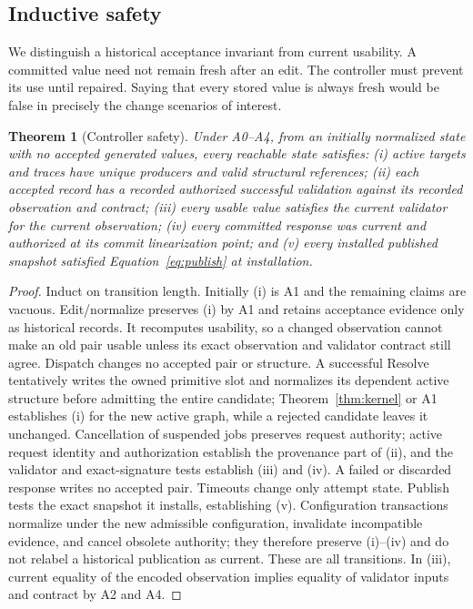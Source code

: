 \documentclass[pdflatex,sn-mathphys-num]{sn-jnl}
\theoremstyle{thmstyleone}
\newtheorem{theorem}{Theorem}
\theoremstyle{thmstylethree}
\theoremstyle{thmstyletwo}
\begin{document}
\subsection{Inductive safety}
We distinguish a historical acceptance invariant from current usability. A committed value need not remain fresh after an edit. The controller must prevent its use until repaired. Saying that every stored value is always fresh would be false in precisely the change scenarios of interest.

\begin{theorem}[Controller safety]\label{thm:safety}
Under A0--A4, from an initially normalized state with no accepted generated values, every reachable state satisfies: (i) active targets and traces have unique producers and valid structural references; (ii) each accepted record has a recorded authorized successful validation against its recorded observation and contract; (iii) every usable value satisfies the current validator for the current observation; (iv) every committed response was current and authorized at its commit linearization point; and (v) every installed published snapshot satisfied Equation~\eqref{eq:publish} at installation.
\end{theorem}
\begin{proof}
Induct on transition length. Initially (i) is A1 and the remaining claims are vacuous. Edit/normalize preserves (i) by A1 and retains acceptance evidence only as historical records. It recomputes usability, so a changed observation cannot make an old pair usable unless its exact observation and validator contract still agree. Dispatch changes no accepted pair or structure. A successful Resolve tentatively writes the owned primitive slot and normalizes its dependent active structure before admitting the entire candidate; Theorem~\ref{thm:kernel} or A1 establishes (i) for the new active graph, while a rejected candidate leaves it unchanged. Cancellation of suspended jobs preserves request authority; active request identity and authorization establish the provenance part of (ii), and the validator and exact-signature tests establish (iii) and (iv). A failed or discarded response writes no accepted pair. Timeouts change only attempt state. Publish tests the exact snapshot it installs, establishing (v). Configuration transactions normalize under the new admissible configuration, invalidate incompatible evidence, and cancel obsolete authority; they therefore preserve (i)--(iv) and do not relabel a historical publication as current. These are all transitions. In (iii), current equality of the encoded observation implies equality of validator inputs and contract by A2 and A4.\qedhere
\end{proof}
\end{document}
